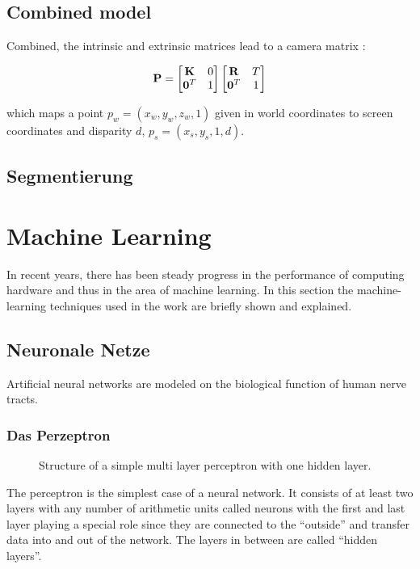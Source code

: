 		\subsection{Combined model}
		Combined, the intrinsic and extrinsic matrices lead to a camera matrix \cite{Szeliski2010}:
		
		\begin{equation}
		\mathbf{P} = \begin{bmatrix}\mathbf{K} & 0\\\mathbf{0}^T & 1\end{bmatrix}
		\begin{bmatrix}\mathbf{R} & T\\\mathbf{0}^T & 1\end{bmatrix}
		\end{equation}
		
		which maps a point $p_w = \left(x_w, y_w, z_w, 1\right)$ given in world coordinates to screen coordinates and disparity $d$, $p_s = \left(x_s, y_s, 1, d\right)$.
		
		
	\subsection { Segmentierung }
		

	
\section { Machine Learning }

		
	In recent years, there has been steady progress in the performance of computing hardware and thus in the area of machine learning.
In this section the machine-learning techniques used in the work are briefly shown and explained.

	\subsection { Neuronale Netze }
	Artificial neural networks 	are modeled on the biological function of human nerve tracts.

		\subsubsection { Das Perzeptron }
		\begin{figure}
					
					\centering
			\caption{Structure of a simple multi layer perceptron with one hidden layer.}
		\end{figure}
		The perceptron is the simplest case of a neural network. It consists of at least two layers with any number of arithmetic units called neurons with the first and last layer playing a special role since they are connected to the "`outside"' and transfer data into and out of the network. The layers in between are called "`hidden layers"'.
		
